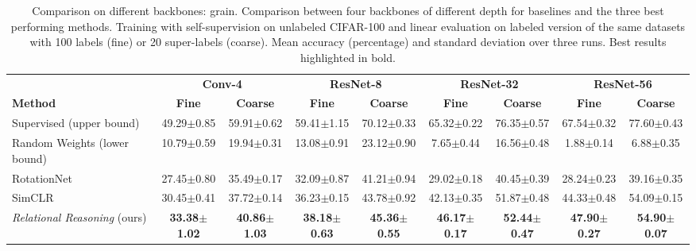 \documentclass{article}
\begin{document}
\begin{table}[H]
 \caption{Comparison on different backbones: grain. Comparison between four backbones of different depth for baselines and the three best performing methods. Training with self-supervision on unlabeled CIFAR-100 and linear evaluation on labeled version of the same datasets with 100 labels (fine) or 20 super-labels (coarse). Mean accuracy (percentage) and standard deviation over three runs. Best results highlighted in bold.}
 \label{tab:backbones_grain}
 \begin{adjustbox}{width=1.0\columnwidth,center}
  \centering
  \begin{tabular}{lcccccccc}
    \toprule
     & \multicolumn{2}{c}{\textbf{Conv-4}} & \multicolumn{2}{c}{\textbf{ResNet-8}} & \multicolumn{2}{c}{\textbf{ResNet-32}} & \multicolumn{2}{c}{\textbf{ResNet-56}}\\
    \cmidrule[0.1pt](r){2-3} \cmidrule[0.1pt](l){4-5} \cmidrule[0.1pt](l){6-7} \cmidrule[0.1pt](l){8-9}
    \textbf{Method} &
    \textbf{Fine} & \textbf{Coarse} &
    \textbf{Fine} & \textbf{Coarse} &
    \textbf{Fine} & \textbf{Coarse} &
    \textbf{Fine} & \textbf{Coarse} \\
    \midrule
    Supervised (upper bound) & 
    49.29$\pm$\small{0.85} & 59.91$\pm$\small{0.62} & 
    59.41$\pm$\small{1.15} & 70.12$\pm$\small{0.33} & 
    65.32$\pm$\small{0.22} & 76.35$\pm$\small{0.57} & 
    67.54$\pm$\small{0.32} & 77.60$\pm$\small{0.43} \\
    Random Weights (lower bound) & 
    10.79$\pm$\small{0.59} & 19.94$\pm$\small{0.31} & 
    13.08$\pm$\small{0.91} & 23.12$\pm$\small{0.90} & 
     7.65$\pm$\small{0.44} & 16.56$\pm$\small{0.48} &  
     1.88$\pm$\small{0.14} &  6.88$\pm$\small{0.35} \\
    \cmidrule(l){1-9}
    RotationNet \citep{gidaris2018unsupervised} & 
    27.45$\pm$\small{0.80} & 35.49$\pm$\small{0.17} & 
    32.09$\pm$\small{0.87} & 41.21$\pm$\small{0.94} & 
    29.02$\pm$\small{0.18} & 40.45$\pm$\small{0.39} & 
    28.24$\pm$\small{0.23} & 39.16$\pm$\small{0.35} \\
    SimCLR \citep{chen2020simple} & 
    30.45$\pm$\small{0.41} & 37.72$\pm$\small{0.14} & 
    36.23$\pm$\small{0.15} & 43.78$\pm$\small{0.92} & 
    42.13$\pm$\small{0.35} & 51.87$\pm$\small{0.48} & 
    44.33$\pm$\small{0.48} & 54.09$\pm$\small{0.15} \\    
    \emph{Relational Reasoning} (ours) & 
    \textbf{33.38$\pm$\small{1.02}} & \textbf{40.86$\pm$\small{1.03}} & 
    \textbf{38.18$\pm$\small{0.63}} & \textbf{45.36$\pm$\small{0.55}} & 
    \textbf{46.17$\pm$\small{0.17}} & \textbf{52.44$\pm$\small{0.47}} & 
    \textbf{47.90$\pm$\small{0.27}} & \textbf{54.90$\pm$\small{0.07}} \\
    \bottomrule
  \end{tabular}
 \end{adjustbox}
\end{table}
\end{document}
